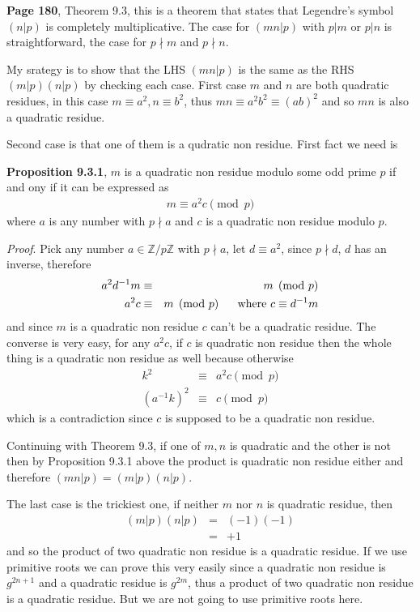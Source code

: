 \documentclass[aps,preprint,preprintnumbers,nofootinbib,showpacs,prd]{revtex4-1}
\newcommand{\nbea}{\begin{eqnarray*}}
\newcommand{\neea}{\end{eqnarray*}}
\begin{document}
{\bf Page 180}, Theorem 9.3, this is a theorem that states that Legendre's symbol $(n|p)$ is completely multiplicative. The case for $(mn|p)$ with $p|m$ or $p|n$ is straightforward, the case for $p\nmid m$ and $p\nmid n$.

My srategy is to show that the LHS $(mn|p)$ is the same as the RHS $(m|p)(n|p)$ by checking each case. First case $m$ and $n$ are both quadratic residues, in this case $m \equiv a^2, n \equiv b^2$, thus $mn \equiv a^2 b^2 \equiv (ab)^2$ and  so $mn$ is also a quadratic residue.

Second case is that one of them is a qudratic non residue. First fact we need is 

{\bf Proposition 9.3.1}, $m$ is a quadratic non residue modulo some odd prime $p$ if and ony if it can be expressed as 
%
\nbea
m \equiv a^2 c \pmod{p}
\neea
%
where $a$ is any number with $p\nmid a$ and $c$ is a quadratic non residue modulo $p$.

{\it Proof}. Pick any number $a \in \mathbb{Z}/p\mathbb{Z}$ with $p\nmid a$, let $d \equiv a^2$, since $p\nmid d$, $d$ has an inverse, therefore
%
\nbea
a^2 d^{-1} m & \equiv & m \pmod{p} \\
a^2 c & \equiv & m \pmod{p} ~~~~~ {\rm where~} c \equiv d^{-1} m
\neea
%
and since $m$ is a quadratic non residue $c$ can't be a quadratic residue. The converse is very easy, for any $a^2 c$, if $c$ is quadratic non residue then the whole thing is a quadratic non residue as well because otherwise
%
\nbea
k^2 & \equiv & a^2 c \pmod{p} \\
(a^{-1} k)^2 & \equiv & c \pmod{p}
\neea
%
which is a contradiction since $c$ is supposed to be a quadratic non residue.

Continuing with Theorem 9.3, if one of $m,n$ is quadratic and the other is not then by Proposition 9.3.1 above the product is quadratic non residue either and therefore $(mn|p) = (m|p)(n|p)$.

The last case is the trickiest one, if neither $m$ nor $n$ is quadratic residue, then
%
\nbea
(m|p)(n|p) & = & (-1)(-1) \\
& = & +1
\neea
%
and so the product of two quadratic non residue is a quadratic residue. If we use primitive roots we can prove this very easily since a quadratic non residue is $g^{2n+1}$ and a quadratic residue is $g^{2m}$, thus a product of two quadratic non residue is a quadratic residue. But we are not going to use primitive roots here.
\end{document}
